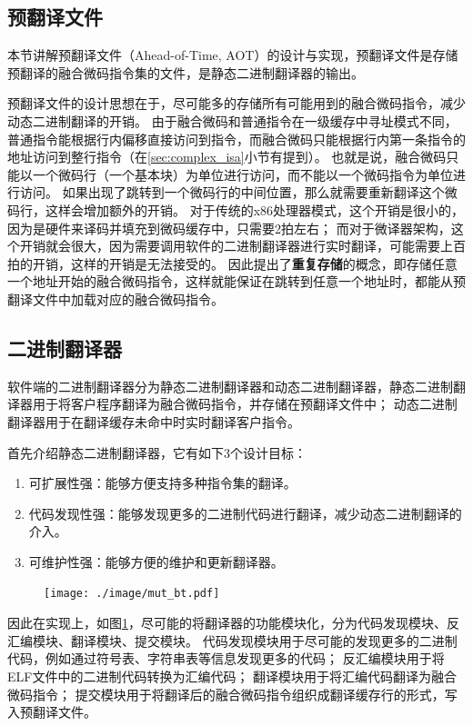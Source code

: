 \subsection{预翻译文件}\label{sec:aot}

本节讲解预翻译文件（Ahead-of-Time, AOT）的设计与实现，预翻译文件是存储预翻译的融合微码指令集的文件，是静态二进制翻译器的输出。

预翻译文件的设计思想在于，尽可能多的存储所有可能用到的融合微码指令，减少动态二进制翻译的开销。
由于融合微码和普通指令在一级缓存中寻址模式不同，普通指令能根据行内偏移直接访问到指令，而融合微码只能根据行内第一条指令的地址访问到整行指令（在\ref{sec:complex_isa}小节有提到）。
也就是说，融合微码只能以一个微码行（一个基本块）为单位进行访问，而不能以一个微码指令为单位进行访问。
如果出现了跳转到一个微码行的中间位置，那么就需要重新翻译这个微码行，这样会增加额外的开销。
对于传统的x86处理器模式，这个开销是很小的，因为是硬件来译码并填充到微码缓存中，只需要2拍左右；
而对于微译器架构，这个开销就会很大，因为需要调用软件的二进制翻译器进行实时翻译，可能需要上百拍的开销，这样的开销是无法接受的。
因此提出了\textbf{重复存储}的概念，即存储任意一个地址开始的融合微码指令，这样就能保证在跳转到任意一个地址时，都能从预翻译文件中加载对应的融合微码指令。


\subsection{二进制翻译器}

软件端的二进制翻译器分为静态二进制翻译器和动态二进制翻译器，静态二进制翻译器用于将客户程序翻译为融合微码指令，并存储在预翻译文件中；
动态二进制翻译器用于在翻译缓存未命中时实时翻译客户指令。

首先介绍静态二进制翻译器，它有如下3个设计目标：
\begin{enumerate}
  \item 可扩展性强：能够方便支持多种指令集的翻译。
  \item 代码发现性强：能够发现更多的二进制代码进行翻译，减少动态二进制翻译的介入。
  \item 可维护性强：能够方便的维护和更新翻译器。
\end{enumerate}

\begin{figure}[!htbp]
  \centering
  \texttt{[image: ./image/mut\_bt.pdf]}
  \label{img:mut_bt}
\end{figure}

因此在实现上，如图\ref{img:mut_bt}，尽可能的将翻译器的功能模块化，分为代码发现模块、反汇编模块、翻译模块、提交模块。
代码发现模块用于尽可能的发现更多的二进制代码，例如通过符号表、字符串表等信息发现更多的代码；
反汇编模块用于将ELF文件中的二进制代码转换为汇编代码；
翻译模块用于将汇编代码翻译为融合微码指令；
提交模块用于将翻译后的融合微码指令组织成翻译缓存行的形式，写入预翻译文件。

